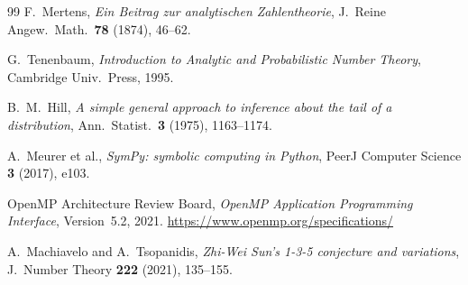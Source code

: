 \documentclass{amsart}
\theoremstyle{definition}
\theoremstyle{remark}
\numberwithin{equation}{section}
\begin{document}
\begin{thebibliography}{99}
F.~Mertens,
\textit{Ein Beitrag zur analytischen Zahlentheorie},
J.\ Reine Angew.\ Math.\ \textbf{78} (1874), 46--62.

G.~Tenenbaum,
\textit{Introduction to Analytic and Probabilistic Number Theory},
Cambridge Univ.\ Press, 1995.

B.~M.~Hill,
\textit{A simple general approach to inference about the tail of a
distribution},
Ann.\ Statist.\ \textbf{3} (1975), 1163--1174.

A.~Meurer et al.,
\textit{SymPy: symbolic computing in Python},
PeerJ Computer Science \textbf{3} (2017), e103.

OpenMP Architecture Review Board,
\textit{OpenMP Application Programming Interface}, Version~5.2, 2021.
\url{https://www.openmp.org/specifications/}

A.~Machiavelo and A.~Tsopanidis,
\textit{Zhi-Wei Sun's 1-3-5 conjecture and variations},
J.\ Number Theory \textbf{222} (2021), 135--155.

\end{thebibliography}
\end{document}
